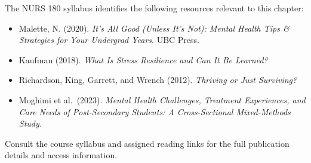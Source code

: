 \documentclass[
  letterpaper,
]{book}
\providecommand{\tightlist}{%
  \setlength{\itemsep}{0pt}\setlength{\parskip}{0pt}}
\begin{document}
The NURS 180 syllabus identifies the following resources relevant to
this chapter:

\begin{itemize}
\tightlist
\item
  Malette, N. (2020). \emph{It's All Good (Unless It's Not): Mental
  Health Tips \& Strategies for Your Undergrad Years}. UBC Press.
\item
  Kaufman (2018). \emph{What Is Stress Resilience and Can It Be
  Learned?}
\item
  Richardson, King, Garrett, and Wrench (2012). \emph{Thriving or Just
  Surviving?}
\item
  Moghimi et al.~(2023). \emph{Mental Health Challenges, Treatment
  Experiences, and Care Needs of Post-Secondary Students: A
  Cross-Sectional Mixed-Methods Study.}
\end{itemize}

Consult the course syllabus and assigned reading links for the full
publication details and access information.


\chapter{}\label{section}


\chapter{}\label{section-1}


\chapter{}\label{section-2}


\chapter{}\label{section-3}


\chapter{}\label{section-4}

\end{document}
